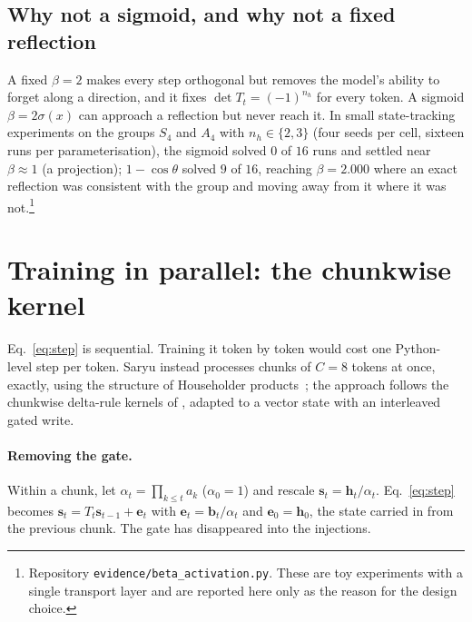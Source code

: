 \documentclass[10pt]{article}
\newcommand{\bh}{\mathbf{h}}
\newcommand{\be}{\mathbf{e}}
\begin{document}
\subsection{Why not a sigmoid, and why not a fixed reflection}

A fixed $\beta=2$ makes every step orthogonal but removes the model's ability to forget along a
direction, and it fixes $\det T_t=(-1)^{n_h}$ for every token. A sigmoid $\beta=2\sigma(x)$ can approach a
reflection but never reach it. In small state-tracking experiments on the groups $S_4$ and $A_4$ with
$n_h\in\{2,3\}$ (four seeds per cell, sixteen runs per parameterisation), the sigmoid solved $0$ of $16$
runs and settled near $\beta\approx1$ (a projection); $1-\cos\theta$ solved $9$ of $16$, reaching
$\beta=2.000$ where an exact reflection was consistent with the group and moving away from it where it was
not.\footnote{Repository \texttt{evidence/beta\_activation.py}. These are toy experiments with a single
transport layer and are reported here only as the reason for the design choice.}

\section{Training in parallel: the chunkwise kernel}
\label{sec:kernel}

Eq.~\ref{eq:step} is sequential. Training it token by token would cost one Python-level step per token.
Saryu instead processes chunks of $C=8$ tokens at once, exactly, using the structure of Householder
products~\cite{bischof1987}; the approach follows the chunkwise delta-rule kernels of
\cite{yang2024delta}, adapted to a vector state with an interleaved gated write.

\paragraph{Removing the gate.} Within a chunk, let $\alpha_t=\prod_{k\le t}a_k$ ($\alpha_0=1$) and rescale
$\mathbf{s}_t=\bh_t/\alpha_t$. Eq.~\ref{eq:step} becomes $\mathbf{s}_t=T_t\mathbf{s}_{t-1}+\be_t$ with
$\be_t=\mathbf{b}_t/\alpha_t$ and $\be_0=\bh_0$, the state carried in from the previous chunk. The gate
has disappeared into the injections.
\end{document}
